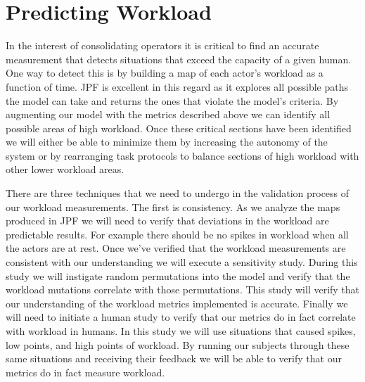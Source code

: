 \section{Predicting Workload}
	In the interest of consolidating operators it is critical to find an accurate measurement that detects situations that exceed the capacity of a given human. One way to detect this is by building a map of each actor's workload as a function of time. JPF is excellent in this regard as it explores all possible paths the model can take and returns the ones that violate the model's criteria. By augmenting our model with the metrics described above we can identify all possible areas of high workload. Once these critical sections have been identified we will either be able to minimize them by increasing the autonomy of the system or by rearranging task protocols to balance sections of high workload with other lower workload areas.

There are three techniques that we need to undergo in the validation process of our workload measurements. The first is consistency. As we analyze the maps produced in JPF we will need to verify that deviations in the workload are predictable results. For example there should be no spikes in workload when all the actors are at rest. Once we've verified that the workload measurements are consistent with our understanding we will execute a sensitivity study. During this study we will instigate random permutations into the model and verify that the workload mutations correlate with those permutations. This study will verify that our understanding of the workload metrics implemented is accurate. Finally we will need to initiate a human study to verify that our metrics do in fact correlate with workload in humans. In this study we will use situations that caused spikes, low points, and high points of workload. By running our subjects through these same situations and receiving their feedback we will be able to verify that our metrics do in fact measure workload.